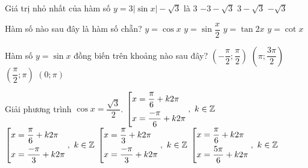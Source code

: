 \begin{ex}%
Giá trị nhỏ nhất của hàm số $ y=3\left|\sin x\right| -\sqrt{3}$ là
\choice
{$ 3 $}
{$ -3-\sqrt{3} $}
{$ 3-\sqrt{3} $}
{\True $ -\sqrt{3} $}
\end{ex}

\begin{ex}%
Hàm số nào sau đây là hàm số chẵn?
\choice
{\True $ y=\cos x $}
{$ y=\sin \dfrac{x}{2} $}
{$ y=\tan 2x $}
{$ y=\cot x $}
\end{ex}


\begin{ex}%
Hàm số $ y=\sin x $ đồng biến trên khoảng nào sau đây?
\choice
{\True $ \left(-\dfrac{\pi}{2}; \dfrac{\pi}{2}\right) $}
{$\left( \pi; \dfrac{3\pi}{2}\right) $}
{$ \left(\dfrac{\pi}{2}; \pi\right) $}
{$ (0; \pi) $}
\end{ex}


\begin{ex}%
Giải phương trình $ \cos x=\dfrac{\sqrt{3}}{2} $.
\choice
{\True $ \left[\begin{aligned}& x=\dfrac{\pi}{6}+k2\pi\\ & x=\dfrac{-\pi}{6}+k2\pi\end{aligned}\right.,\ k\in\mathbb{Z} $}
{$ \left[\begin{aligned}& x=\dfrac{\pi}{6}+k2\pi\\ & x=\dfrac{-\pi}{3}+k2\pi\end{aligned}\right.,\ k\in\mathbb{Z} $}
{$ \left[\begin{aligned}& x=\dfrac{\pi}{3}+k2\pi\\ & x=\dfrac{-\pi}{3}+k2\pi\end{aligned}\right.,\ k\in\mathbb{Z} $}
{$ \left[\begin{aligned}& x=\dfrac{\pi}{6}+k2\pi\\ & x=\dfrac{5\pi}{6}+k2\pi\end{aligned}\right.,\ k\in\mathbb{Z} $}
\end{ex}


